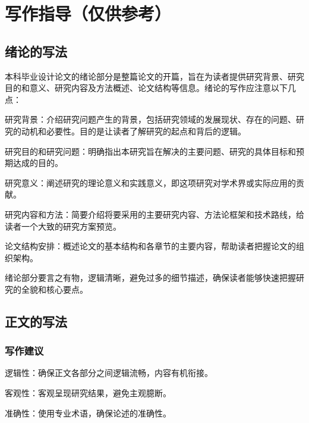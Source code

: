 \newpage
\setcounter{page}{1}        %

\chapter{写作指导（仅供参考）}              %

\section{绪论的写法}     %

本科毕业设计论文的绪论部分是整篇论文的开篇，旨在为读者提供研究背景、研究目的和意义、研究内容及方法概述、论文结构等信息。绪论的写作应注意以下几点：

研究背景：介绍研究问题产生的背景，包括研究领域的发展现状、存在的问题、研究的动机和必要性。目的是让读者了解研究的起点和背后的逻辑。

研究目的和研究问题：明确指出本研究旨在解决的主要问题、研究的具体目标和预期达成的目的。

研究意义：阐述研究的理论意义和实践意义，即这项研究对学术界或实际应用的贡献。

研究内容和方法：简要介绍将要采用的主要研究内容、方法论框架和技术路线，给读者一个大致的研究方案预览。

论文结构安排：概述论文的基本结构和各章节的主要内容，帮助读者把握论文的组织架构。

绪论部分要言之有物，逻辑清晰，避免过多的细节描述，确保读者能够快速把握研究的全貌和核心要点。

\section{正文的写法}    %

\subsection{写作建议}   %

逻辑性：确保正文各部分之间逻辑流畅，内容有机衔接。

客观性：客观呈现研究结果，避免主观臆断。

准确性：使用专业术语，确保论述的准确性。


